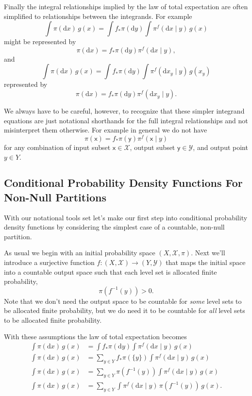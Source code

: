 \documentclass[
  letterpaper,
  DIV=11,
  numbers=noendperiod]{scrartcl}
\begin{document}
Finally the integral relationships implied by the law of total
expectation are often simplified to relationships between the
integrands. For example \[
\int \pi( \mathrm{d} x ) \, g(x)
=
\int f_{*} \pi (\mathrm{d} y)
\int \pi^{f}( \mathrm{d} x \mid y ) \, g(x)
\] might be represented by \[
\pi( \mathrm{d} x )
=
f_{*} \pi (\mathrm{d} y) \pi^{f}( \mathrm{d} x \mid y ),
\] and \[
\int \pi( \mathrm{d} x ) \, g(x)
=
\int f_{*} \pi (\mathrm{d} y)
\int \pi^{f}( \mathrm{d} x_{y} \mid y ) \, g(x_{y})
\] represented by \[
\pi( \mathrm{d} x )
=
f_{*} \pi (\mathrm{d} y) \pi^{f}( \mathrm{d} x_{y} \mid y ).
\]

We always have to be careful, however, to recognize that these simpler
integrand equations are just notational shorthands for the full integral
relationships and not misinterpret them otherwise. For example in
general we do not have \[
\pi( \mathsf{x} )
=
f_{*} \pi (\mathsf{y}) \pi^{f}( \mathsf{x} \mid y )
\] for any combination of input subset \(\mathsf{x} \in \mathcal{X}\),
output subset \(\mathsf{y} \in \mathcal{Y}\), and output point
\(y \in Y\).

\subsection{Conditional Probability Density Functions For Non-Null
Partitions}\label{sec:discrete-conditional-density}

With our notational tools set let's make our first step into conditional
probability density functions by considering the simplest case of a
countable, non-null partition.

As usual we begin with an initial probability space
\((X, \mathcal{X}, \pi)\). Next we'll introduce a surjective function
\(f : (X, \mathcal{X}) \rightarrow (Y, \mathcal{Y})\) that maps the
initial space into a countable output space such that each level set is
allocated finite probability, \[
\pi( f^{-1}(y) ) > 0.
\] Note that we don't need the output space to be countable for
\emph{some} level sets to be allocated finite probability, but we do
need it to be countable for \emph{all} level sets to be allocated finite
probability.

With these assumptions the law of total expectation becomes
\begin{align*}
\int \pi( \mathrm{d} x ) \, g(x)
&=
\int f_{*} \pi (\mathrm{d} y)
\int \pi^{f}( \mathrm{d} x \mid y ) \, g(x)
\\
\int \pi( \mathrm{d} x ) \, g(x)
&=
\sum_{y \in Y} f_{*} \pi ( \{ y \} )
\int \pi^{f}( \mathrm{d} x \mid y ) \, g(x)
\\
\int \pi( \mathrm{d} x ) \, g(x)
&=
\sum_{y \in Y} \pi ( f^{-1}(y) )
\int \pi^{f}( \mathrm{d} x \mid y ) \, g(x)
\\
\int \pi( \mathrm{d} x ) \, g(x)
&=
\sum_{y \in Y} \int \pi^{f}( \mathrm{d} x \mid y ) \,
\pi ( f^{-1}(y) ) \, g(x).
\end{align*}
\end{document}
